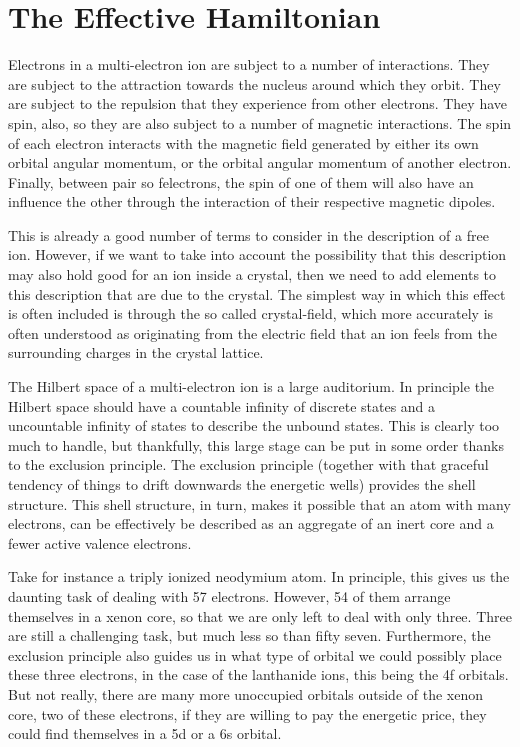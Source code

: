 \documentclass{article}
\begin{document}
\section{The Effective Hamiltonian} 

\begin{multicols}{2}

Electrons in a multi-electron ion are subject to a number of interactions. They are subject to the attraction towards the nucleus around which they orbit. They are subject to the repulsion that they experience from other electrons. They have spin, also, so they are also subject to a number of magnetic interactions. The spin of each electron interacts with the magnetic field generated by either its own orbital angular momentum, or the orbital angular momentum of another electron. Finally, between pair so felectrons, the spin of one of them will also have an influence the other through the interaction of their respective magnetic dipoles.

This is already a good number of terms to consider in the description of a free ion. However, if we want to take into account the possibility that this description may also hold good for an ion inside a crystal, then we need to add elements to this description that are due to the crystal. The simplest way in which this effect is often included is through the so called crystal-field, which more accurately is often understood as originating from the electric field that an ion feels from the surrounding charges in the crystal lattice.

The Hilbert space of a multi-electron ion is a large auditorium. In principle the Hilbert space should have a countable infinity of discrete states and a uncountable infinity of states to describe the unbound states. This is clearly too much to handle, but thankfully, this large stage can be put in some order thanks to the exclusion principle. The exclusion principle (together with that graceful tendency of things to drift downwards the energetic wells) provides the shell structure. This shell structure, in turn, makes it possible that an atom with many electrons, can be effectively be described as an aggregate of an inert core and a fewer active valence electrons.  

Take for instance a triply ionized neodymium atom. In principle, this gives us the daunting task of dealing with 57 electrons. However, 54 of them arrange themselves in a xenon core, so that we are only left to deal with only three. Three are still a challenging task, but much less so than fifty seven. Furthermore, the exclusion principle also guides us in what type of orbital we could possibly place these three electrons, in the case of the lanthanide ions, this being the 4f orbitals. But not really, there are many more unoccupied orbitals outside of the xenon core, two of these electrons, if they are willing to pay the energetic price, they could find themselves in a 5d or a 6s orbital.  


\end{multicols}
\end{document}
